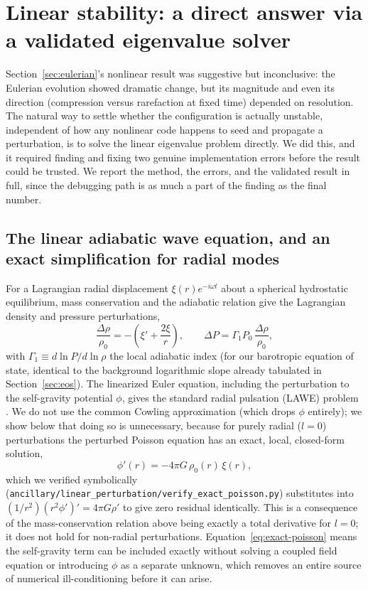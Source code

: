 \documentclass[11pt]{article}
\begin{document}
\section{Linear stability: a direct answer via a validated eigenvalue solver}
\label{sec:linear}

Section~\ref{sec:eulerian}'s nonlinear result was suggestive but inconclusive: the Eulerian evolution showed dramatic change, but its magnitude and even its direction (compression versus rarefaction at fixed time) depended on resolution. The natural way to settle whether the configuration is actually unstable, independent of how any nonlinear code happens to seed and propagate a perturbation, is to solve the linear eigenvalue problem directly. We did this, and it required finding and fixing two genuine implementation errors before the result could be trusted. We report the method, the errors, and the validated result in full, since the debugging path is as much a part of the finding as the final number.

\subsection{The linear adiabatic wave equation, and an exact simplification for radial modes}

For a Lagrangian radial displacement $\xi(r)e^{-i\omega t}$ about a spherical hydrostatic equilibrium, mass conservation and the adiabatic relation give the Lagrangian density and pressure perturbations,
\begin{equation}
\frac{\Delta\rho}{\rho_0}=-\left(\xi'+\frac{2\xi}{r}\right),\qquad \Delta P=\Gamma_1 P_0\,\frac{\Delta\rho}{\rho_0},
\end{equation}
with $\Gamma_1\equiv d\ln P/d\ln\rho$ the local adiabatic index (for our barotropic equation of state, identical to the background logarithmic slope already tabulated in Section~\ref{sec:eos}). The linearized Euler equation, including the perturbation to the self-gravity potential $\phi$, gives the standard radial pulsation (LAWE) problem \citep{Pekeris1938,Cowling1941,Chandrasekhar1964}. We do not use the common Cowling approximation (which drops $\phi$ entirely); we show below that doing so is unnecessary, because for purely radial ($l=0$) perturbations the perturbed Poisson equation has an exact, local, closed-form solution,
\begin{equation}
\phi'(r) = -4\pi G\,\rho_0(r)\,\xi(r),
\label{eq:exact-poisson}
\end{equation}
which we verified symbolically (\texttt{ancillary/linear\_perturbation/verify\_exact\_poisson.py}) substitutes into $(1/r^2)(r^2\phi')'=4\pi G\rho'$ to give zero residual identically. This is a consequence of the mass-conservation relation above being exactly a total derivative for $l=0$; it does not hold for non-radial perturbations. Equation~\eqref{eq:exact-poisson} means the self-gravity term can be included exactly without solving a coupled field equation or introducing $\phi$ as a separate unknown, which removes an entire source of numerical ill-conditioning before it can arise.
\end{document}
